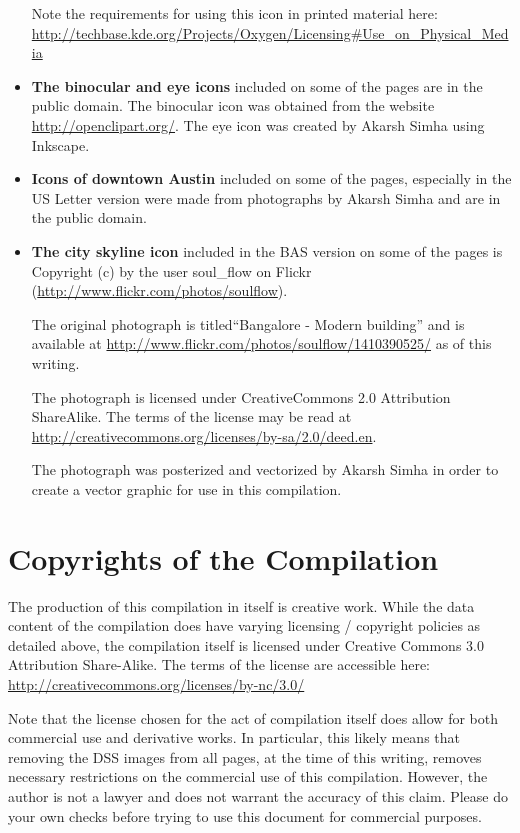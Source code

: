 \begin{itemize}
  Note the requirements for using this icon in printed material here:
  \url{http://techbase.kde.org/Projects/Oxygen/Licensing#Use_on_Physical_Media}

\item \textbf{The binocular and eye icons} included on some of the
  pages are in the public domain. The binocular icon was obtained from
  the website \url{http://openclipart.org/}. The eye icon was created
  by Akarsh Simha using Inkscape.

\item \textbf{Icons of downtown Austin} included on some of the pages,
  especially in the US Letter version were made from photographs by
  Akarsh Simha and are in the public domain.

\item \textbf{The city skyline icon} included in the BAS version on
  some of the pages is Copyright (c) by the user soul\_flow on Flickr
  (\url{http://www.flickr.com/photos/soulflow}).

  The original photograph is titled``Bangalore - Modern building'' and
  is available at
  \url{http://www.flickr.com/photos/soulflow/1410390525/} as of this
  writing.

  The photograph is licensed under CreativeCommons 2.0 Attribution
  ShareAlike. The terms of the license may be read at
  \url{http://creativecommons.org/licenses/by-sa/2.0/deed.en}.

  The photograph was posterized and vectorized by Akarsh Simha in
  order to create a vector graphic for use in this compilation.

\end{itemize}

\section{Copyrights of the Compilation}

The production of this compilation in itself is creative work. While
the data content of the compilation does have varying licensing /
copyright policies as detailed above, the compilation itself is
licensed under Creative Commons 3.0 Attribution Share-Alike. The terms
of the license are accessible here:
\url{http://creativecommons.org/licenses/by-nc/3.0/}

Note that the license chosen for the act of compilation itself does
allow for both commercial use and derivative works. In particular,
this likely means that removing the DSS images from all pages, at the
time of this writing, removes necessary restrictions on the commercial
use of this compilation. However, the author is not a lawyer and does
not warrant the accuracy of this claim. Please do your own checks
before trying to use this document for commercial purposes.

